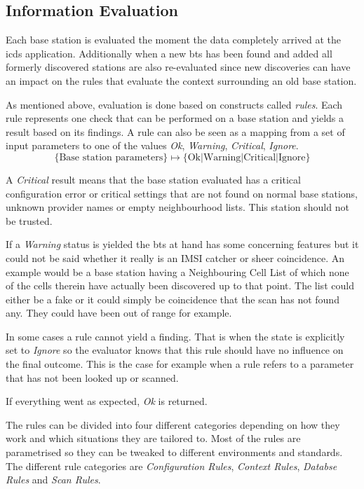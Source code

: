 \subsection{Information Evaluation}
\label{sec:info_evaluation}
Each base station is evaluated the moment the data completely arrived at the \gls{icds} application.
Additionally when a new \gls{bts} has been found and added all formerly discovered stations are also re-evaluated since new discoveries can have an impact on the rules that evaluate the context surrounding an old base station.

As mentioned above, evaluation is done based on constructs called \emph{rules}.
Each rule represents one check that can be performed on a base station and yields a result based on its findings.
A rule can also be seen as a mapping from a set of input parameters to one of the values \emph{Ok}, \emph{Warning}, \emph{Critical}, \emph{Ignore}.
\[\lbrace \text{Base station parameters}\rbrace \mapsto \lbrace \text{Ok}\lvert\text{Warning}\lvert\text{Critical}\lvert\text{Ignore}\rbrace\]

A \emph{Critical} result means that the base station evaluated has a critical configuration error or critical settings that are not found on normal base stations, \eg unknown provider names or empty neighbourhood lists.
This station should not be trusted.

If a \emph{Warning} status is yielded the \gls{bts} at hand has some concerning features but it could not be said whether it really is an IMSI catcher or sheer coincidence.
An example would be a base station having a  Neighbouring Cell List of which none of the cells therein have actually been discovered up to that point.
The list could either be a fake or it could simply be coincidence that the scan has not found any.
They could have been out of range for example.

In some cases a rule cannot yield a finding.
That is when the state is explicitly set to \emph{Ignore} so the evaluator knows that this rule should have no influence on the final outcome.	
This is the case for example when a rule refers to a parameter that has not been looked up or scanned.

If everything went as expected, \emph{Ok} is returned.

The rules can be divided into four different categories depending on how they work and which situations they are tailored to.
Most of the rules are parametrised so they can be tweaked to different environments and standards.
The different rule categories are \emph{Configuration Rules}, \emph{Context Rules}, \emph{Databse Rules} and \emph{Scan Rules}.

